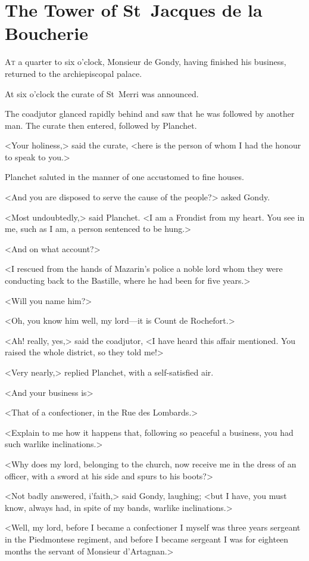 \chapter{The Tower of St~Jacques de la Boucherie}

 \lettrine{A}{t} a quarter to six o'clock, Monsieur de Gondy, having finished his business, returned to the archiepiscopal palace.

\zz
At six o'clock the curate of St~Merri was announced.

\zz
The coadjutor glanced rapidly behind and saw that he was followed by another man. The curate then entered, followed by Planchet.

<Your holiness,> said the curate, <here is the person of whom I had the honour to speak to you.>

Planchet saluted in the manner of one accustomed to fine houses.

<And you are disposed to serve the cause of the people?> asked Gondy.

<Most undoubtedly,> said Planchet. <I am a Frondist from my heart. You see in me, such as I am, a person sentenced to be hung.>

<And on what account?>

<I rescued from the hands of Mazarin's police a noble lord whom they were conducting back to the Bastille, where he had been for five years.>

<Will you name him?>

<Oh, you know him well, my lord—it is Count de Rochefort.>

<Ah! really, yes,> said the coadjutor, <I have heard this affair mentioned. You raised the whole district, so they told me!>

<Very nearly,> replied Planchet, with a self-satisfied air.

<And your business is\longdash>

<That of a confectioner, in the Rue des Lombards.>

<Explain to me how it happens that, following so peaceful a business, you had such warlike inclinations.>

<Why does my lord, belonging to the church, now receive me in the dress of an officer, with a sword at his side and spurs to his boots?>

<Not badly answered, i'faith,> said Gondy, laughing; <but I have, you must know, always had, in spite of my bands, warlike inclinations.>

<Well, my lord, before I became a confectioner I myself was three years sergeant in the Piedmontese regiment, and before I became sergeant I was for eighteen months the servant of Monsieur d'Artagnan.>

